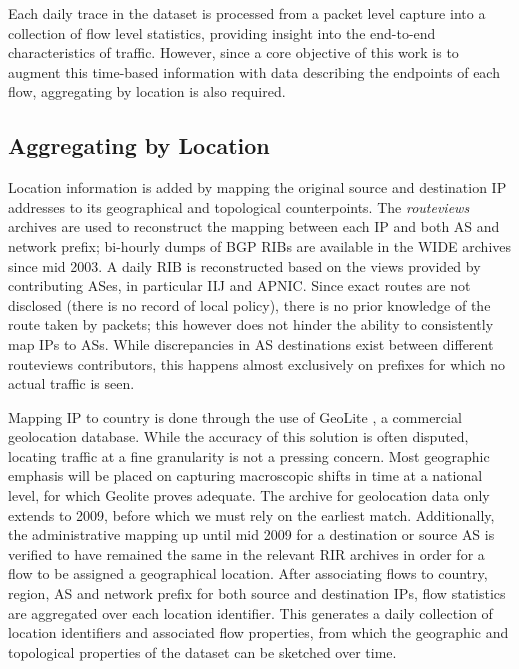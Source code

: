 Each daily trace in the dataset is processed from a packet level capture into a collection of flow level statistics, providing insight into the end-to-end characteristics of traffic. 
However, since a core objective of this work is to augment this time-based information with data describing the endpoints of each flow, aggregating by location is also required. 

\subsection{Aggregating by Location}

Location information is added by mapping the original source and destination \ac{IP} addresses to its geographical and topological counterpoints. 
The \emph{routeviews} \cite{routeviews} archives are used to reconstruct the mapping between each \ac{IP} and both \ac{AS} and network prefix; bi-hourly dumps of \ac{BGP} \acp{RIB} are available in the \acs{WIDE} archives since mid 2003. 
A daily \ac{RIB} is reconstructed based on the views provided by contributing ASes, in particular \ac{IIJ} and \ac{APNIC}.
Since exact routes are not disclosed (there is no record of local policy), there is no prior knowledge of the route taken by packets; this however does not hinder the ability to consistently map \acp{IP} to \acp{AS}.
While discrepancies in \ac{AS} destinations exist between different routeviews contributors, this happens almost exclusively on prefixes for which no actual traffic is seen. 

Mapping \ac{IP} to country is done through the use of GeoLite \cite{maxmind}, a commercial geolocation database. 
While the accuracy of this solution is often disputed, locating traffic at a fine granularity is not a pressing concern.
Most geographic emphasis will be placed on capturing macroscopic shifts in time at a national level, for which Geolite proves adequate.
The archive for geolocation data only extends to 2009, before which we must rely on the earliest match. 
Additionally, the administrative mapping up until mid 2009 for a destination or source \ac{AS} is verified to have remained the same in the relevant \ac{RIR} archives in order for a flow to be assigned a geographical location.
After associating flows to country, region, \ac{AS} and network prefix for both source and destination \acp{IP}, flow statistics are aggregated over each location identifier. 
This generates a daily collection of location identifiers and associated flow properties, from which the geographic and topological properties of the dataset can be sketched over time.
